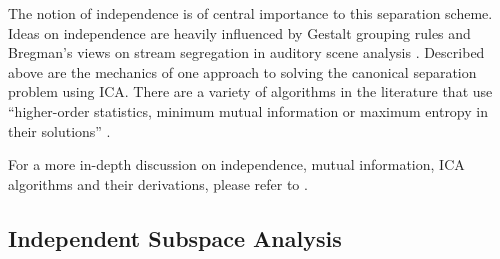 The notion of independence is of central importance to this separation
scheme. Ideas on independence are heavily influenced by Gestalt 
grouping rules and Bregman's views on stream segregation in auditory scene
analysis \cite{Bregman:90}\cite{Casey:2000}. Described above are the
mechanics of one approach to solving the canonical separation problem
using ICA. There are a variety of algorithms in the literature that
use ``higher-order statistics, minimum mutual information or maximum
entropy in their solutions'' \cite{Knuth:98}.

For a more in-depth discussion on independence, mutual information,
ICA algorithms and their derivations, please refer to \cite{Knuth:98}\cite{hyvarinen:99survey}\cite{smaragdis:97}\cite{Farid:99}\cite{Casey:2000}.

\vspace{5mm}
\subsection{Independent Subspace Analysis}

